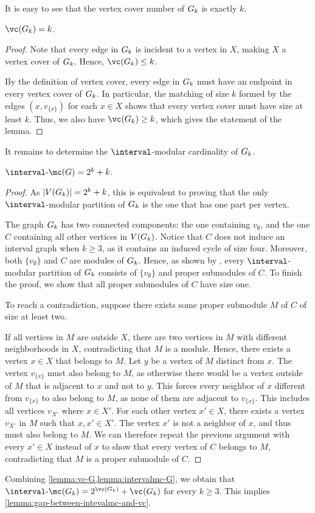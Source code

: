 It is easy to see that the vertex cover number of $G_{k}$ is exactly $k$.
\begin{lemma}
    \label{lemma:vc-G}
    $\vc(\graph) = k$.
\end{lemma}
\begin{proof}
    Note that every edge in $G_{k}$ is incident to a vertex in $X$, making $X$ a vertex cover of $G_{k}$. Hence, $\vc(\graph) \leq k$.

    By the definition of vertex cover, every edge in $G_{k}$ must have an endpoint in every vertex cover of $G_{k}$. In particular, the matching of size $k$ formed by the edges $(x, v_{\{x\}})$ for each $x \in X$ shows that every vertex cover must have size at least $k$. Thus, we also have $\vc(\graph) \geq k$, which gives the statement of the lemma.
\end{proof}

It remains to determine the $\interval$-modular cardinality of $G_{k}$.

\begin{lemma}
    \label{lemma:intervalmc-G}
    $\intervalmc(G) = 2^k + k$.
\end{lemma}
\begin{proof}
    As $|V(G_{k})| = 2^k + k$, this is equivalent to proving that the only $\interval$-modular partition of $G_{k}$ is the one that has one part per vertex.

    The graph $G_{k}$ has two connected components: the one containing $v_\emptyset$, and the one $C$ containing all other vertices in $V(G_{k})$. Notice that $C$ does not induce an interval graph when $k \geq 3$, as it contains an induced cycle of size four. Moreover, both $\{v_\emptyset\}$ and $C$ are modules of $G_{k}$. Hence, as shown by \citet{modular-decomposition}, every $\interval$-modular partition of $G_{k}$ consists of $\{v_\emptyset\}$ and proper submodules of $C$. To finish the proof, we show that all proper submodules of $C$ have size one.

    To reach a contradiction, suppose there exists some proper submodule $M$ of $C$ of size at least two.

    If all vertices in $M$ are outside $X$, there are two vertices in $M$ with different neighborhoods in $X$, contradicting that $M$ is a module. Hence, there exists a vertex $x \in X$ that belongs to $M$. Let $y$ be a vertex of $M$ distinct from $x$. The vertex $v_{\{x\}}$ must also belong to $M$, as otherwise there would be a vertex outside of $M$ that is adjacent to $x$ and not to $y$. This forces every neighbor of $x$ different from $v_{\{x\}}$ to also belong to $M$, as none of them are adjacent to $v_{\{x\}}$. This includes all vertices $v_{X'}$ where $x \in X'$. For each other vertex $x' \in X$, there exists a vertex $v_{X'}$ in $M$ such that $x, x' \in X'$. The vertex $x'$ is not a neighbor of $x$, and thus must also belong to $M$. We can therefore repeat the previous argument with every $x' \in X$ instead of $x$ to show that every vertex of $C$ belongs to $M$, contradicting that $M$ is a proper submodule of $C$.
\end{proof}

Combining \cref{lemma:vc-G,lemma:intervalmc-G}, we obtain that $\intervalmc(\graph) = 2^{\vc(\graph)} + \vc(\graph)$ for every $k \geq 3$. This implies \cref{lemma:gap-between-intevalmc-and-vc}.